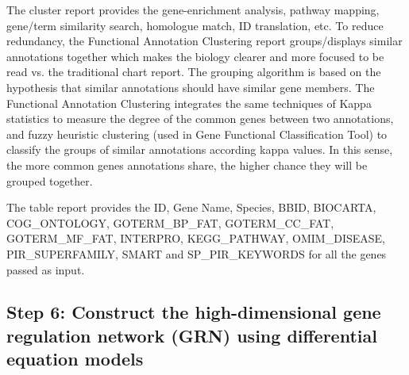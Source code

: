 The cluster report provides the gene-enrichment analysis, pathway mapping, gene/term similarity search, homologue match, ID translation, etc. To reduce redundancy, the Functional Annotation Clustering report groups/displays similar annotations together which makes the biology clearer and more focused to be read vs. the traditional chart report. The grouping algorithm is based on the hypothesis that similar annotations should have similar gene members. The Functional Annotation Clustering integrates the same techniques of  Kappa statistics to measure the degree of the common genes between two annotations, and fuzzy heuristic clustering (used in Gene Functional Classification Tool) to classify the groups of similar annotations according kappa values. In this sense, the more common genes annotations share, the higher chance they will be grouped together.

The table report provides the ID, Gene Name, Species, BBID, BIOCARTA, COG\_ONTOLOGY, GOTERM\_BP\_FAT, GOTERM\_CC\_FAT, GOTERM\_MF\_FAT, INTERPRO, KEGG\_PATHWAY, OMIM\_DISEASE, PIR\_SUPERFAMILY, SMART and SP\_PIR\_KEYWORDS for all the genes passed as input.



\subsection*{Step 6: Construct the high-dimensional gene regulation network (GRN) using differential equation models}


